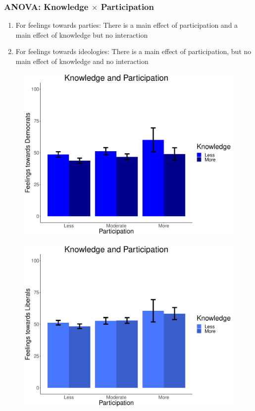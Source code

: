\documentclass[14pt]{beamer}
\begin{document}
\begin{frame}
\frametitle{ANOVA: Knowledge $\times$ Participation}
\begin{enumerate}
	\item For feelings towards parties: There is a main effect of participation and a main effect of knowledge but no interaction
	\item For feelings towards ideologies: There is a main effect of participation, but no main effect of knowledge and no interaction
\end{enumerate}
\end{frame}

\begin{frame}
\begin{center}
	\begin{figure}[ht!]  
		{	 \includegraphics[width=.9\textwidth]{KPDem}}
	\end{figure}
\end{center}
\end{frame}

\begin{frame}
\begin{center}
\begin{figure}[ht!]  
	{	 \includegraphics[width=.9\textwidth]{KPLib}}
\end{figure}
\end{center}
\end{frame}
\end{document}
